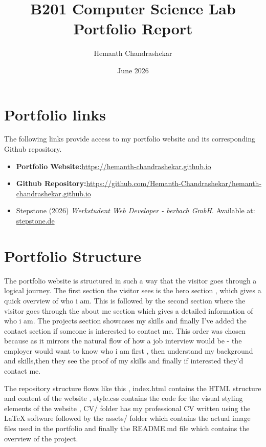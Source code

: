 \documentclass{article}
\title{B201 Computer Science Lab\\Portfolio Report}
\author{Hemanth Chandrashekar}
\date{June 2026}
\begin{document}
\maketitle
\section{Portfolio links}
The following links provide access to my portfolio website and its corresponding Github repository.
\begin{itemize}
    \item \textbf{Portfolio Website:}\href{https://hemanth-chandrashekar.github.io}{https://hemanth-chandrashekar.github.io}
    \item \textbf{Github Repository:}\href {https://github.com/Hemanth-Chandrashekar/hemanth-chandrashekar.github.io}{https://github.com/Hemanth-Chandrashekar/hemanth-chandrashekar.github.io}
    \item Stepstone (2026) \textit{Werkstudent Web Developer - berbach GmbH}. Available at: \href{https://stepstone.de/stellenangebote--WERKSTUDENT-WEB-DEVELOPER-M-W-D-Berlin-Kreuzberg-berbach-GmbH-Gestaltung-und-Beratung--12732537-inline.html}{stepstone.de}
\end{itemize}
\section{Portfolio Structure}
The portfolio website is structured  in such a way that the visitor goes through a logical journey. The first section the visitor sees is the hero section , which gives a quick overview of who i am. This is followed by the second section where the visitor goes through the about me section which gives a detailed information of who i am. The projects section showcases my skills and finally I've added the contact section if someone is interested to contact me. This order was chosen because as it mirrors the natural flow of how a job interview would be - the employer would want to know who i am first , then understand my background and skills,then they see the proof of my skills and finally if interested they'd contact me. 

The repository structure flows like this , index.html contains the HTML structure and content of the website , style.css contains the code for the visual styling elements of the website , CV/ folder has my professional CV written using the LaTeX software followed by the assets/ folder which contains the actual image files used in the portfolio and finally the README.md file which contains the overview of the project. 
\end{document}
